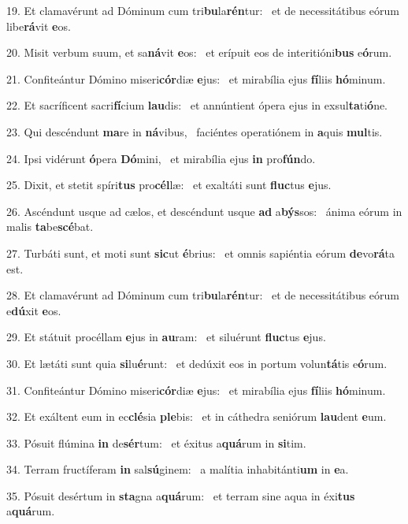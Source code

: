 19. Et clamavérunt ad Dóminum cum tri\textbf{bu}la\textbf{rén}tur: \ast\  et de necessitátibus eórum libe\textbf{rá}vit \textbf{e}os.\

20. Misit verbum suum, et sa\textbf{ná}vit \textbf{e}os: \ast\  et erípuit eos de interitióni\textbf{bus} e\textbf{ó}rum.\

21. Confiteántur Dómino miseri\textbf{cór}diæ \textbf{e}jus: \ast\  et mirabília ejus \textbf{fí}liis \textbf{hó}minum.\

22. Et sacríficent sacri\textbf{fí}cium \textbf{lau}dis: \ast\  et annúntient ópera ejus in exsul\textbf{ta}ti\textbf{ó}ne.\

23. Qui descéndunt \textbf{ma}re in \textbf{ná}vibus, \ast\  faciéntes operatiónem in \textbf{a}quis \textbf{mul}tis.\

24. Ipsi vidérunt \textbf{ó}pera \textbf{Dó}mini, \ast\  et mirabília ejus \textbf{in} pro\textbf{fún}do.\

25. Dixit, et stetit spíri\textbf{tus} pro\textbf{cél}læ: \ast\  et exaltáti sunt \textbf{fluc}tus \textbf{e}jus.\

26. Ascéndunt usque ad cælos, et descéndunt usque \textbf{ad} a\textbf{býs}sos: \ast\  ánima eórum in malis \textbf{ta}be\textbf{scé}bat.\

27. Turbáti sunt, et moti sunt \textbf{sic}ut \textbf{é}brius: \ast\  et omnis sapiéntia eórum \textbf{de}vo\textbf{rá}ta est.\

28. Et clamavérunt ad Dóminum cum tri\textbf{bu}la\textbf{rén}tur: \ast\  et de necessitátibus eórum e\textbf{dú}xit \textbf{e}os.\

29. Et státuit procéllam \textbf{e}jus in \textbf{au}ram: \ast\  et siluérunt \textbf{fluc}tus \textbf{e}jus.\

30. Et lætáti sunt quia \textbf{si}lu\textbf{é}runt: \ast\  et dedúxit eos in portum volun\textbf{tá}tis e\textbf{ó}rum.\

31. Confiteántur Dómino miseri\textbf{cór}diæ \textbf{e}jus: \ast\  et mirabília ejus \textbf{fí}liis \textbf{hó}minum.\

32. Et exáltent eum in ec\textbf{clé}sia \textbf{ple}bis: \ast\  et in cáthedra seniórum \textbf{lau}dent \textbf{e}um.\

33. Pósuit flúmina \textbf{in} de\textbf{sér}tum: \ast\  et éxitus a\textbf{quá}rum in \textbf{si}tim.\

34. Terram fructíferam \textbf{in} sal\textbf{sú}ginem: \ast\  a malítia inhabitánti\textbf{um} in \textbf{e}a.\

35. Pósuit desértum in \textbf{sta}gna a\textbf{quá}rum: \ast\  et terram sine aqua in éxi\textbf{tus} a\textbf{quá}rum.\

